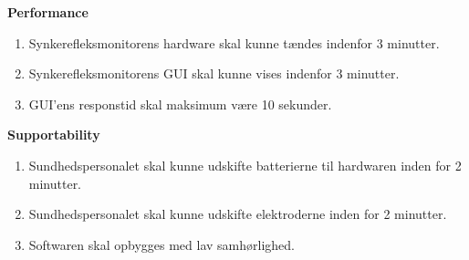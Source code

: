 					
\textbf{Performance}
\begin{enumerate}[resume]
\item Synkerefleksmonitorens hardware skal kunne tændes indenfor 3 minutter.
\item Synkerefleksmonitorens GUI skal kunne vises indenfor 3 minutter.
\item GUI'ens responstid skal maksimum være 10 sekunder.

\end{enumerate}


\textbf{Supportability}
\begin{enumerate}[resume]
\item Sundhedspersonalet skal kunne udskifte batterierne til hardwaren inden for 2 minutter.
\item Sundhedspersonalet skal kunne udskifte elektroderne inden for 2 minutter.
\item Softwaren skal opbygges med lav samhørlighed.
\end{enumerate}

\newpage

\newpage
\listoffigures
\newpage
\listoftables

